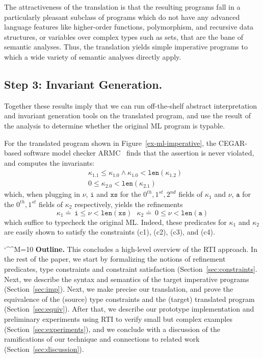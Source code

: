 \documentclass[nocopyrightspace]{sigplanconf}
\makeatletter
\newcommand{\defeq}{\doteq\ }
\def\mypara#1{\smallskip\noindent\textbf{#1}}
\newcommand\ML{\textsc{ML}\xspace}
\newcommand\HMC{\textsc{RTI}\xspace}
\newcommand\ARMC{\textsc{ARMC}\xspace}
\newcommand{\ttxs}{\mathtt{xs}}
\newcommand{\tta}{\mathtt{a}}
\newcommand{\tti}{\mathtt{i}}
\def\ttxs{\mathtt{xs}}
\def\@comment{\let\do\@makeother \dospecials\catcode`\^^M=10\def\par{}}
\def\begincomment{\@comment\@xcomment}
\newenvironment{comment}{\begincomment}{}
\def\valu{\nu}
\newcommand{\kvar}{\kappa}
\newcommand{\ttlen}{\mathtt{len}}
\def\rkvar{{\kvar}}
\makeatother
\begin{document}
The attractiveness of the translation is that the resulting 
programs fall in a particularly pleasant subclass of programs 
which do not have any advanced language features like
higher-order functions, polymorphism, and recursive data structures,
or variables over complex types such as sets,
that are the bane of semantic analyses.
Thus, the translation yields simple imperative programs to which 
a wide variety of semantic analyses directly apply.


\subsection{Step 3: Invariant Generation.}
Together these results imply that we can run off-the-shelf 
abstract interpretation and invariant generation tools on the 
translated program, and use the result of the analysis to 
determine whether the original \ML program is typable. 


For the translated program shown in Figure~\ref{ex-ml-imperative}, 
the CEGAR-based software model checker \ARMC~\cite{PADL07} 
finds that the assertion is never violated, and
computes the invariants:
\begin{align*}
& \rkvar_1.1 \leq \rkvar_1.0 \wedge \rkvar_1.0 < \ttlen(\rkvar_1.2)  \\
& 0 \leq \kvar_2.0 < \ttlen (\rkvar_2.1)
\end{align*}
which, when plugging in $\valu$, $\tti$ and $\ttxs$ for the 
$0^{th},1^{st},2^{nd}$ fields of $\rkvar_1$ 
and $\valu$, $\tta$ for the $0^{th}, 1^{st}$ fields of $\rkvar_2$
respectively, yields the refinements
\[
\kvar_1 \defeq  \tti \leq \valu < \ttlen(\ttxs) \ \ \ 
\kvar_2 \defeq  0 \leq \valu < \ttlen (\tta)
\]
which suffice to typecheck the original \ML. 
Indeed, these predicates for $\kvar_1$ and $\kvar_2$ are easily shown to satisfy the
constraints (c1), (c2), (c3), and (c4).

\begin{comment}
\mypara{Outline.}
This concludes a high-level overview of the \HMC approach. 
In the rest of the paper, we start by formalizing the 
notions of refinement predicates, type constraints and constraint
satisfaction (Section~\ref{sec:constraints}.
Next, we describe the syntax and semantics of the target imperative
programs (Section~\ref{sec:imp}).
Next, we make precise our translation, and prove the equivalence of
the (source) type constraints and the (target) translated program
(Section~\ref{sec:equiv}).
After that, we describe our prototype implementation and preliminary
experiments using \HMC to verify small but complex examples
(Section~\ref{sec:experiments}), and we conclude with a discussion of
the ramifications of our technique and connections to related work
(Section~\ref{sec:discussion}).
\end{comment}
\end{document}
